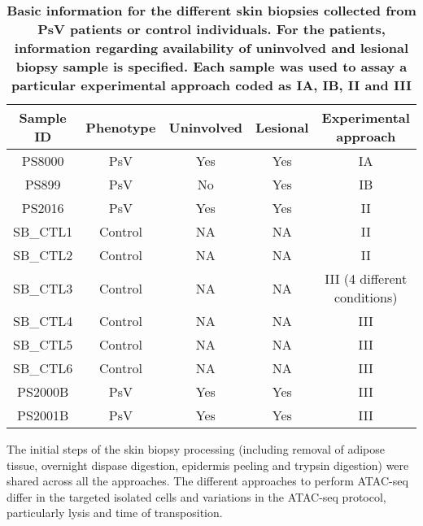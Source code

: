 \begin{table}[htbp]
\begin{tabular}{@{} c c c c c}
\toprule
\textbf{Sample ID} & \textbf{Phenotype}  & \textbf{Uninvolved}  & \textbf{Lesional} & \textbf{Experimental approach} \\
\midrule
PS8000        & PsV & Yes & Yes & IA \\
PS899         & PsV & No & Yes & IB \\
PS2016        & PsV & Yes & Yes & II \\
SB_CTL1       & Control & NA & NA & II \\
SB_CTL2       & Control & NA & NA & II \\
SB_CTL3       & Control & NA & NA & III (4 different conditions) \\
SB_CTL4       & Control & NA & NA & III\\
SB_CTL5       & Control & NA & NA & III\\
SB_CTL6       & Control & NA & NA & III\\
PS2000B       & PsV & Yes & Yes & III\\
PS2001B       & PsV & Yes & Yes & III\\
\bottomrule
\end{tabular}
\medskip %
\caption[Skin biopsies cohort and experimental approach to study the chromatin accessibility landscape using ATAC-seq]{\textbf{Basic information for the different skin biopsies collected from PsV patients or control individuals. For the patients, information regarding availability of uninvolved and lesional biopsy sample is specified. Each sample was used to assay a particular experimental approach coded as IA, IB, II and III}}
\label{tab:SkinCohort}
\end{table}
\bigskip %


The initial steps of the skin biopsy processing (including removal of adipose tissue, overnight dispase digestion, epidermis peeling and trypsin digestion) were shared across all the approaches. The different approaches to perform ATAC-seq differ in the targeted isolated cells and variations in the ATAC-seq protocol, particularly lysis and time of transposition.


